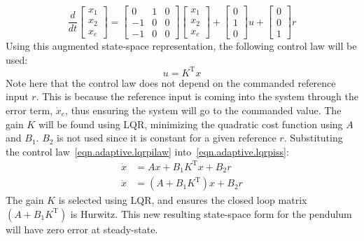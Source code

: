 \begin{equation*}
  \frac{d}{dt}
  \begin{bmatrix}
    x_1 \\
    x_2 \\
    x_{e}
  \end{bmatrix} =
  \begin{bmatrix}
    0 & 1 & 0\\
    -1 & 0 & 0\\
    -1 & 0 & 0
  \end{bmatrix}
  \begin{bmatrix}
    x_{1} \\
    x_{2} \\
    x_{e}
  \end{bmatrix}+
  \begin{bmatrix}
    0 \\
    1 \\
    0
  \end{bmatrix}u +
  \begin{bmatrix}
    0 \\
    0 \\
    1
  \end{bmatrix}r
\end{equation*}
Using this augmented state-space representation, the following control law will be used:
\begin{equation}\label{eqn.adaptive.lqrpilaw}
  u=K^{\text{T}}x
 \end{equation}
Note here that the control law does not depend on the commanded reference input $r$.
This is because the reference input is coming into the system through the error term, $\dot{x}_{e}$, thus ensuring the system will go to the commanded value.
The gain $K$ will be found using LQR, minimizing the quadratic cost function using $A$ and $B_{1}$.
$B_{2}$ is not used since it is constant for a given reference $r$.
Substituting the control law~\eqref{eqn.adaptive.lqrpilaw} into~\eqref{eqn.adaptive.lqrpiss}:
\begin{equation*}
  \begin{split}
    \dot{x}&=Ax+B_{1}K^{\text{T}}x+B_{2}r \\
    \dot{x}&=\left(A+B_{1}K^{\text{T}}\right)x+B_{2}r
  \end{split}
\end{equation*}
The gain $K$ is selected using LQR, and ensures the closed loop matrix $\left(A+B_{1}K^{\text{T}}\right)$ is Hurwitz.
This new resulting state-space form for the pendulum will have zero error at steady-state.

